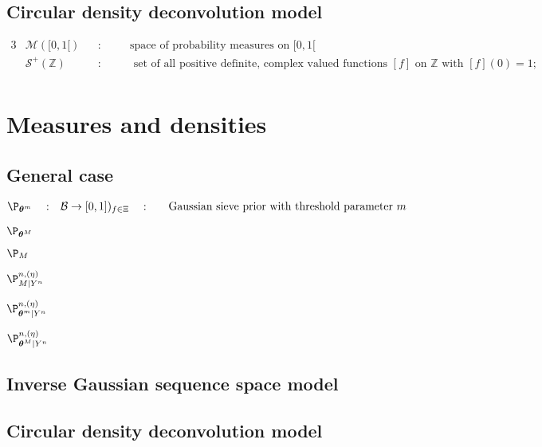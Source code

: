 \subsection*{Circular density deconvolution model}
\begin{alignat*}{3}
& \mathcal{M}([0, 1[) && : && \quad \text{space of probability measures on } [0, 1[\\
& \mathcal{S}^{+}(\mathds{Z}) && : && \quad \text{ set of all positive definite, complex valued functions } [f] \text{ on } \mathds{Z} \text{ with } [f](0) = 1;\\
\end{alignat*}

\section*{Measures and densities}

\subsection*{General case}
\begin{alignat*}{5}
& \P_{\boldsymbol{\theta}^{m}} &&:&& \mathcal{B} \rightarrow [0,1])_{f \in \Xi} &&:&& \quad \text{Gaussian sieve prior with threshold parameter }m\\
\end{alignat*}


$\P_{\boldsymbol{\theta}^{M}}$

$\P_{M}$

$\P_{M \vert Y^{n}}^{n, (\eta)}$

$\P_{\boldsymbol{\theta}^{m}\vert Y^{n}}^{n, (\eta)}$

$\P_{\boldsymbol{\theta}^{M}\vert Y^{n}}^{n, (\eta)}$

\subsection*{Inverse Gaussian sequence space model}
\subsection*{Circular density deconvolution model}

